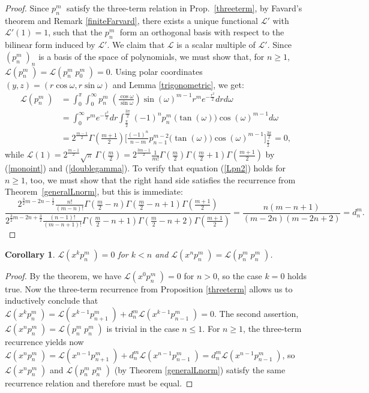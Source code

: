 \documentclass{amsart}
\newcommand{\p}[2]{p_{#1}^{#2}\;\!\!}
\renewcommand{\L}{\mathcal{L}}
\theoremstyle{plain}
\newtheorem{corollary}[theorem]{Corollary}
\theoremstyle{definition}
\theoremstyle{remark}
\begin{document}
\begin{proof}
Since $\p{n}{m}$ satisfy the three-term relation in Prop.~\ref{threeterm}, by Favard's theorem and Remark \ref{finiteFarvard}, there exists a unique functional $\L'$ with $\L'(1)=1$, such that the $\p{n}{m}$ form an orthogonal basis with respect to the bilinear form induced by $\L'$. We claim that $\L$ is a scalar multiple of $\L'$.
Since $(\p{n}{m})_{n} $ is a basis of the space of polynomials, we must show that, for $n\geq 1$, $\L(\p{n}{m}) = \L(\p{n}{m}\p{0}{m}) =0$.
Using polar coordinates $(y,z) = (r\cos\omega,r\sin\omega)$ and Lemma \ref{trigonometric}, we get:
\begin{align*}
\L(\p{n}{m}) &= \int_0^\pi\!\!\int_0^\infty\p{n}{m}\!\left(\tfrac{\cos\omega}{\sin\omega}\right)\sin(\omega)^{m-1} r^m e^{-\frac{r^2}{2}}dr d\omega \\
&=\int_0^\infty r^m e^{-\frac{r^2}{2}}dr \int_{\frac{\pi}{2}}^{\frac{3\pi}{2}} (-1)^n \p{n}{m}\big(\tan(\omega)\big)\cos(\omega)^{m-1}d\omega\\
&= 2^{\frac{m-1}{2}}\Gamma\left(\tfrac{m+1}{2}\right)\Big[\tfrac{(-1)^n}{n-m}p_{n-1}^{m-2}\big(\tan(\omega)\big)\cos(\omega)^{m-1} \Big]_{\frac{\pi}{2}}^{\frac{3\pi}{2}} =0,
\end{align*}
while $\L(1) = 2^{\frac{m-1}{2}}\sqrt{\pi}\,\Gamma\!\left(\frac{m}{2}\right)=2^{\frac{3m-1}{2}}  \frac{1}{m!}
\Gamma\left(\frac{m}{2}\right)\Gamma\left(\frac{m}{2}+1\right)\Gamma\left(\frac{m+1}{2}\right)$ by (\ref{monoint}) and (\ref{doublegamma}). To verify that equation (\ref{Lpn2}) holds for $n\geq 1$, too, we must show that the right hand side satisfies the recurrence from Theorem~\ref{generalLnorm}, but this is immediate:
$$ 
\frac{2^{\frac{3}{2}m\!-\!2n\!-\!\frac{1}{2}}  \frac{n!}{(m\!-\!n)!}
\Gamma\!\left(\frac{m}{2}\!-\!n\right)\Gamma\!\left(\frac{m}{2}\!-\!n\!+\!1\right)\Gamma\!\left(\frac{m+1}{2}\right)}{
2^{\frac{3}{2}m\!-\!2n\!+\!\frac{3}{2}}  \frac{(n\!-\!1)!}{(m\!-\!n\!+\!1)!}
\Gamma\!\left(\frac{m}{2}\!-\!n\!+\!1\right)\Gamma\!\left(\frac{m}{2}\!-\!n\!+\!2\right)\Gamma\!\left(\frac{m+1}{2}\right)} = \frac{n(m\!-\!n\!+\!1)}{(m\!-\!2n)(m\!-\!2n\!+\!2)} =d_n^m.
$$
\end{proof}
\begin{corollary} \label{pcor}
 $\L(x^{k}\p{n}{m}) = 0$ for $k < n$ and $\L(x^n\p{n}{m})= \L(\p{n}{m}\p{n}{m})$.
\end{corollary}
\begin{proof} By the theorem, we have $\L(x^{0}\p{n}{m}) = 0$ for $n>0$, so the case $k=0$ holds true.
Now the three-term recurrence from Proposition \ref{threeterm} allows us to inductively conclude that $\L(x^k\p{n}{m}) = \L(x^{k-1}\p{n+1}{m})+d_n^m\L(x^{k-1}\p{n-1}{m}) =0$.
The second assertion, $\L(x^n\p{n}{m})= \L(\p{n}{m}\p{n}{m})$ is trivial in the case $n\leq 1$. For $n\geq 1$, the three-term recurrence yields now $\L(x^n\p{n}{m}) = \L(x^{n-1}\p{n+1}{m})+d_n^m\L(x^{n-1}\p{n-1}{m})=d_n^m\L(x^{n-1}\p{n-1}{m})$, so $\L(x^n\p{n}{m})$ and $\L(\p{n}{m}\p{n}{m})$ (by Theorem \ref{generalLnorm}) satisfy the same recurrence relation and therefore must be equal.
\end{proof}
\end{document}
